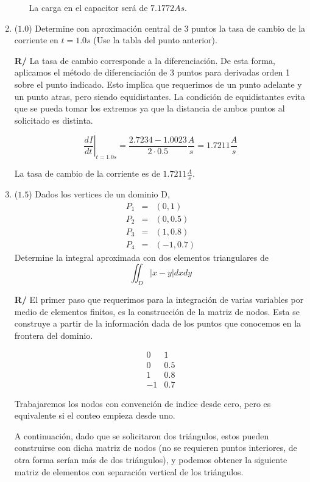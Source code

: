 \documentclass[12pt]{article}
\newcommand{\diff}[3]{\frac{d^{#3} #1}{d#2^{#3}}}
\begin{document}
\begin{enumerate}[leftmargin=*,widest=9]
\begin{enumerate}[label=\alph*]
La carga en el capacitor será de \(7.1772As\).

    \end{enumerate}


    \item (\(1.0\)) Determine con aproximación central de 3 puntos la tasa de cambio de la corriente en $t = 1.0 s$ (Use la tabla del punto anterior).


\textbf{R/} La tasa de cambio corresponde a la diferenciación. De esta forma, aplicamos el método de diferenciación de 3 puntos para derivadas orden 1 sobre el punto indicado. Esto implica que requerimos de un punto adelante y un punto atras, pero siendo equidistantes. La condición de equidistantes evita que se pueda tomar los extremos ya que la distancia de ambos puntos al solicitado es distinta.

\[
\left.\diff{I}{t}{}\right|_{t=1.0s} = \frac{2.7234-1.0023}{2\cdot 0.5} \frac{A}{s} = 1.7211 \frac{A}{s}
\]

La tasa de cambio de la corriente es de \(1.7211 \frac{A}{s}\).


   \item (\(1.5\)) Dados los vertices de un dominio D,
   	\begin{eqnarray*}
   	P_1 &=& (0 , 1) \\ P_2 &=& (0 , 0.5) \\ P_3 &=& (1 , 0.8) \\ P_4 &=& (-1 , 0.7)
   	\end{eqnarray*}
Determine la integral aproximada con dos elementos triangulares de $$\iint _{D} |x-y| dx dy$$

\textbf{R/} El primer paso que requerimos para la integración de varias variables por medio de elementos finitos, es la construcción de la matriz de nodos. Esta se construye a partir de la información dada de los puntos que conocemos en la frontera del dominio.

\[
\begin{array}{cc}
0 & 1\\
0 & 0.5\\
1 & 0.8\\
-1 & 0.7
\end{array}
\]

Trabajaremos los nodos con convención de indice desde cero, pero es equivalente si el conteo empieza desde uno.

A continuación, dado que se solicitaron dos triángulos, estos pueden construirse con dicha matriz de nodos (no se requieren puntos interiores, de otra forma serían más de dos triángulos), y podemos obtener la siguiente matriz de elementos con separación vertical de los triángulos.


\end{enumerate}
\end{document}
